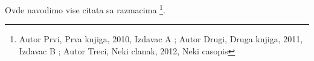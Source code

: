 \documentclass{article}
\begin{document}
Ovde navodimo vise citata sa razmacima \footnote{Autor Prvi, Prva knjiga, 2010, Izdavac A ; Autor Drugi, Druga knjiga, 2011, Izdavac B ; Autor Treci, Neki clanak, 2012, Neki casopis}.
\end{document}
